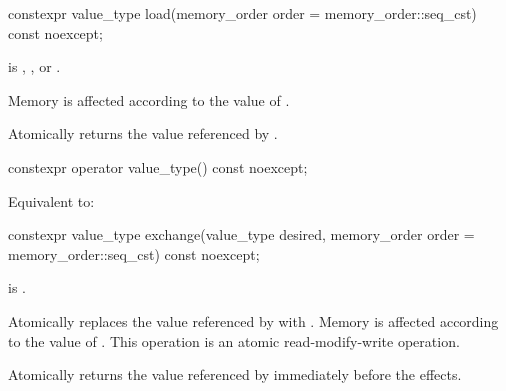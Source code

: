%
%
%
%
\begin{itemdecl}
constexpr value_type load(memory_order order = memory_order::seq_cst) const noexcept;
\end{itemdecl}

\begin{itemdescr}
\pnum
\expects
{} is
,
, or
.

\pnum
\effects
Memory is affected according to the value of .

\pnum
\returns
Atomically returns the value referenced by .
\end{itemdescr}

%
%
%
%
\begin{itemdecl}
constexpr operator value_type() const noexcept;
\end{itemdecl}

\begin{itemdescr}
\pnum
\effects
Equivalent to: 
\end{itemdescr}

%
%
%
%
\begin{itemdecl}
constexpr value_type exchange(value_type desired,
                              memory_order order = memory_order::seq_cst) const noexcept;
\end{itemdecl}

\begin{itemdescr}
\pnum
\constraints
{} is .

\pnum
\effects
Atomically replaces the value referenced by 
with .
Memory is affected according to the value of .
This operation is an atomic read-modify-write operation.

\pnum
\returns
Atomically returns the value referenced by 
immediately before the effects.
\end{itemdescr}

